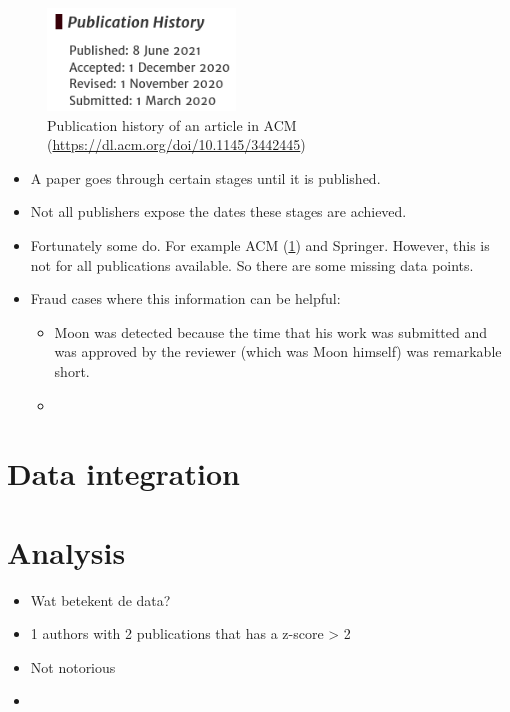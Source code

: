\documentclass{ou-report}
\newcommand{\outline}[1]{{\color{blue} #1}}
\begin{document}
\begin{figure}[H]
\centering
\includegraphics[width=5cm]{ACM_Digital_Threats_Research_and_Practice.png}
\caption{Publication history of an article in ACM (\url{https://dl.acm.org/doi/10.1145/3442445})}
\label{fig:acm_dates}
\end{figure}
\begin{itemize}
    \item A paper goes through certain stages until it is published.
    \item Not all publishers expose the dates these stages are achieved. 
    \item Fortunately some do. For example ACM (\ref{fig:acm_dates}) and Springer. However, this is not for all publications available. So there are some missing data points.
    \item Fraud cases where this information can be helpful:
    \begin{itemize}
        \item Moon was detected because the time that his work was submitted and was approved by the reviewer (which was Moon himself) was remarkable short.
        \item ~\cite{SNCMBL2021}
    \end{itemize}
\end{itemize}

\section{Data integration}

\section{Analysis}
\outline{
\begin{itemize}
    \item Wat betekent de data?
\end{itemize}
}
\begin{itemize}
    \item 1 authors with 2 publications that has a z-score > 2
    \item Not notorious
    \item 
    
\end{itemize}
\end{document}
